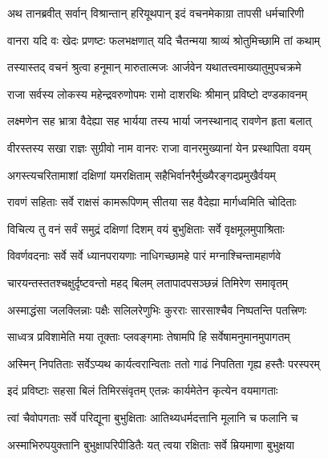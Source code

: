 
\twolineshloka
{अथ तानब्रवीत् सर्वान् विश्रान्तान् हरियूथपान्}
{इदं वचनमेकाग्रा तापसी धर्मचारिणी} %

\twolineshloka
{वानरा यदि वः खेदः प्रणष्टः फलभक्षणात्}
{यदि चैतन्मया श्राव्यं श्रोतुमिच्छामि तां कथाम्} %

\twolineshloka
{तस्यास्तद् वचनं श्रुत्वा हनूमान् मारुतात्मजः}
{आर्जवेन यथातत्त्वमाख्यातुमुपचक्रमे} %

\twolineshloka
{राजा सर्वस्य लोकस्य महेन्द्रवरुणोपमः}
{रामो दाशरथिः श्रीमान् प्रविष्टो दण्डकावनम्} %

\twolineshloka
{लक्ष्मणेन सह भ्रात्रा वैदेह्या सह भार्यया}
{तस्य भार्या जनस्थानाद् रावणेन हृता बलात्} %

\twolineshloka
{वीरस्तस्य सखा राज्ञः सुग्रीवो नाम वानरः}
{राजा वानरमुख्यानां येन प्रस्थापिता वयम्} %

\twolineshloka
{अगस्त्यचरितामाशां दक्षिणां यमरक्षिताम्}
{सहैभिर्वानरैर्मुख्यैरङ्गदप्रमुखैर्वयम्} %

\twolineshloka
{रावणं सहिताः सर्वे राक्षसं कामरूपिणम्}
{सीतया सह वैदेह्या मार्गध्वमिति चोदिताः} %

\twolineshloka
{विचित्य तु वनं सर्वं समुद्रं दक्षिणां दिशम्}
{वयं बुभुक्षिताः सर्वे वृक्षमूलमुपाश्रिताः} %

\twolineshloka
{विवर्णवदनाः सर्वे सर्वे ध्यानपरायणाः}
{नाधिगच्छामहे पारं मग्नाश्चिन्तामहार्णवे} %

\twolineshloka
{चारयन्तस्ततश्चक्षुर्दृष्टवन्तो महद् बिलम्}
{लतापादपसञ्छन्नं तिमिरेण समावृतम्} %

\twolineshloka
{अस्माद्धंसा जलक्लिन्नाः पक्षैः सलिलरेणुभिः}
{कुरराः सारसाश्चैव निष्पतन्ति पतत्त्रिणः} %

\twolineshloka
{साध्वत्र प्रविशामेति मया तूक्ताः प्लवङ्गमाः}
{तेषामपि हि सर्वेषामनुमानमुपागतम्} %

\twolineshloka
{अस्मिन् निपतिताः सर्वेऽप्यथ कार्यत्वरान्विताः}
{ततो गाढं निपतिता गृह्य हस्तैः परस्परम्} %

\twolineshloka
{इदं प्रविष्टाः सहसा बिलं तिमिरसंवृतम्}
{एतन्नः कार्यमेतेन कृत्येन वयमागताः} %

\twolineshloka
{त्वां चैवोपगताः सर्वे परिद्यूना बुभुक्षिताः}
{आतिथ्यधर्मदत्तानि मूलानि च फलानि च} %

\twolineshloka
{अस्माभिरुपयुक्तानि बुभुक्षापरिपीडितैः}
{यत् त्वया रक्षिताः सर्वे म्रियमाणा बुभुक्षया} %

